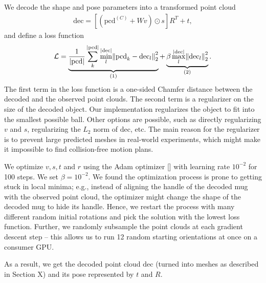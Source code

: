 \documentclass{article}
\newcommand{\rob}[1]{\textcolor{green}{[\textbf{rob:} #1]}}
\newcommand{\tk}[1]{\textcolor{magenta}{[\textbf{TK:} #1]}}
\newcommand{\pcx}[1]{\mathrm{pcd}^{(#1)}}
\newcommand{\pcc}{\pcx{C}}
\begin{document}
We decode the shape and pose parameters into a transformed point cloud
\begin{align}
    \mathrm{dec} = [(\pcc + W v) \odot s] R^T + t,
\end{align}
and define a loss function
\begin{align}
    \mathcal{L} = \underbrace{\frac{1}{|\mathrm{pcd}|} \sum_k^{|\mathrm{pcd}|} \min_l^{|\mathrm{dec}|} \norm{\mathrm{pcd}_k - \mathrm{dec}_l}_2^2}_{\text{(1)}} + \underbrace{\beta \max_l^{|\mathrm{dec}|} \norm{\mathrm{dec}_l}_2^2}_{\text{(2)}}.
\end{align}
The first term in the loss function is a one-sided Chamfer distance between the decoded and the observed point clouds. The second term is a regularizer on the size of the decoded object. Our implementation regularizes the object to fit into the smallest possible ball. Other options are possible, such as directly regularizing $v$ and $s$, regularizing the $L_2$ norm of $\mathrm{dec}$, etc. The main reason for the regularizer is to prevent large predicted meshes in real-world experiments, which might make it impossible to find collision-free motion plans.

We optimize $v, s, t$ and $r$ using the Adam optimizer [] with learning rate $10^{-2}$ for 100 steps. We set $\beta=10^{-2}$. We found the optimization process is prone to getting stuck in local minima; e.g., instead of aligning the handle of the decoded mug with the observed point cloud, the optimizer might change the shape of the decoded mug to hide its handle. Hence, we restart the process with many different random initial rotations and pick the solution with the lowest loss function. Further, we randomly subsample the point clouds at each gradient descent step -- this allows us to run 12 random starting orientations at once on a consumer GPU.

As a result, we get the decoded point cloud $\mathrm{dec}$ (turned into meshes as described in Section X) and its pose represented by $t$ and $R$.



\end{document}
